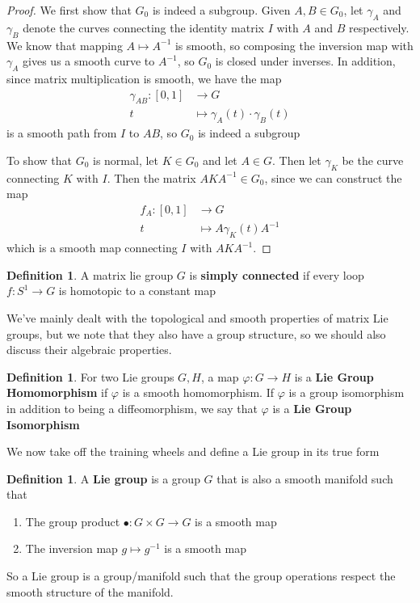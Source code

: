 \documentclass[psamsfonts]{amsart}
\theoremstyle{definition}
\newtheorem{defn}[thm]{Definition}
\theoremstyle{remark}
\newcommand{\inv}{^{-1}}
\begin{document}
\begin{proof}
We first show that $G_0$ is indeed a subgroup. Given $A, B \in G_0$,  let $\gamma_A$ and $\gamma_B$ denote the curves connecting the identity matrix $I$ with $A$ and $B$ respectively. We know that mapping $A \mapsto A\inv$ is smooth, so composing the inversion map with $\gamma_A$ gives us a smooth curve to $A\inv$, so $G_0$ is closed under inverses. In addition, since matrix multiplication is smooth, we have the map
\begin{align*}
\gamma_{AB}:[0,1] &\to G \\
t &\mapsto \gamma_A(t)\cdot\gamma_B(t)
\end{align*} 
is a smooth path from $I$ to $AB$, so $G_0$ is indeed a subgroup

To show that $G_0$ is normal, let $K \in G_0$ and let $A \in G$. Then let $\gamma_K$ be the curve connecting $K$ with $I$. Then the matrix $AKA\inv \in G_0$, since we can construct the map
\begin{align*}
f_A: [0,1] &\to G \\
t &\mapsto A\gamma_K(t)A\inv
\end{align*}
which is a smooth map connecting $I$ with $AKA\inv$.
\end{proof}

\begin{defn}
A matrix lie group $G$ is \textbf{simply connected} if  every loop $f: S^1 \to G$ is homotopic to a constant map
\end{defn}

We've mainly dealt with the topological and smooth properties of matrix Lie groups, but we note that they also have a group structure, so we should also discuss their algebraic properties.

\begin{defn}
For two Lie groups $G, H$, a map $\varphi: G \to H$ is a \textbf{Lie Group Homomorphism} if $\varphi$ is a smooth homomorphism. If $\varphi$ is a group isomorphism in addition to being a diffeomorphism, we say that $\varphi$ is a \textbf{Lie Group Isomorphism}
\end{defn}

We now take off the training wheels and define a Lie group in its true form

\begin{defn}
A \textbf{Lie group} is a group $G$ that is also a smooth manifold such that 
\begin{enumerate}
\item The group product $\bullet: G \times G \to G$ is a smooth map
\item The inversion map $g \mapsto g\inv$ is a smooth map
\end{enumerate}
\end{defn}
So a Lie group is a group/manifold such that the group operations respect the smooth structure of the manifold.
\end{document}
